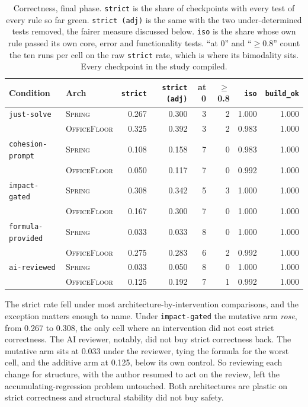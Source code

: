 \documentclass[11pt,a4paper]{article}
\newcommand{\sprg}{\textsc{Spring}}
\newcommand{\offl}{\textsc{OfficeFloor}}
\begin{document}
\begin{table}[h]
\centering
\caption{Correctness, final phase. \texttt{strict} is the share of checkpoints
with every test of every rule so far green. \texttt{strict (adj)} is the same with
the two under-determined tests removed, the fairer measure discussed below.
\texttt{iso} is
the share whose own rule passed its own core, error and functionality tests. ``at
0'' and ``$\ge$0.8'' count the ten runs per cell on the raw \texttt{strict} rate,
which is where its bimodality sits. Every checkpoint in the study compiled.}
\label{tab:correctness}
\small
\setlength{\tabcolsep}{5pt}
\begin{tabular}{llrrrrrr}
\toprule
Condition & Arch & \texttt{strict} & \texttt{strict (adj)} & at 0 & $\ge$0.8 & \texttt{iso} & \texttt{build\_ok} \\
\midrule
\texttt{just-solve}       & \sprg{} & 0.267 & 0.300 & 3 & 2 & 1.000 & 1.000 \\
                          & \offl{} & 0.325 & 0.392 & 3 & 2 & 0.983 & 1.000 \\
\addlinespace
\texttt{cohesion-prompt}  & \sprg{} & 0.108 & 0.158 & 7 & 0 & 0.983 & 1.000 \\
                          & \offl{} & 0.050 & 0.117 & 7 & 0 & 0.992 & 1.000 \\
\addlinespace
\texttt{impact-gated}     & \sprg{} & 0.308 & 0.342 & 5 & 3 & 1.000 & 1.000 \\
                          & \offl{} & 0.167 & 0.300 & 7 & 0 & 1.000 & 1.000 \\
\addlinespace
\texttt{formula-provided} & \sprg{} & 0.033 & 0.033 & 8 & 0 & 1.000 & 1.000 \\
                          & \offl{} & 0.275 & 0.283 & 6 & 2 & 0.992 & 1.000 \\
\addlinespace
\texttt{ai-reviewed}      & \sprg{} & 0.033 & 0.050 & 8 & 0 & 1.000 & 1.000 \\
                          & \offl{} & 0.125 & 0.192 & 7 & 1 & 0.992 & 1.000 \\
\bottomrule
\end{tabular}
\end{table}

The strict rate fell under most architecture-by-intervention comparisons, and the
exception matters enough to name. Under \texttt{impact-gated} the mutative arm
\emph{rose}, from 0.267 to 0.308, the only cell where an intervention did not cost
strict correctness. The AI reviewer, notably, did not buy strict correctness back.
The mutative arm sits at 0.033 under the reviewer, tying the formula for the worst
cell, and the additive arm at 0.125, below its own control. So reviewing each
change for structure, with the author resumed to act on the review, left the
accumulating-regression problem untouched. Both architectures are plastic on
strict correctness and structural stability did not buy safety.
\end{document}
